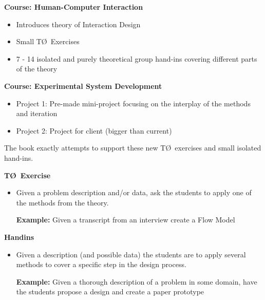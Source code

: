 \begin{frame}
  \textbf{Course: Human-Computer Interaction}
  \begin{itemize}
  \item Introduces theory of Interaction Design
  \item Small T\O\ Exercises 
  \item 7 - 14 isolated and purely theoretical group hand-ins covering different
    parts of the theory
  \end{itemize}

  \medskip
  
  \textbf{Course: Experimental System Development}
  \begin{itemize}
  \item Project 1: Pre-made mini-project focusing on the interplay of the
    methods and iteration
  \item Project 2: Project for client (bigger than current)
  \end{itemize}
\end{frame}


\begin{frame}
  The book exactly attempts to support these new T\O\ exercises and small
  isolated hand-ins.

  \medskip
  
  \textbf{T\O\ Exercise}
  \begin{itemize}
  \item Given a problem description and/or data, ask the students to apply one
    of the methods from the theory.

    \medskip
    
    \textbf{Example:} Given a transcript from an interview create a Flow Model
  \end{itemize}

  \medskip
  
  \textbf{Handins}
  \begin{itemize}
  \item Given a description (and possible data) the students are to apply
    several methods to cover a specific step in the design process.

    \medskip
    
    \textbf{Example:} Given a thorough description of a problem in some domain,
    have the students propose a design and create a paper prototype
  \end{itemize}
\end{frame}


